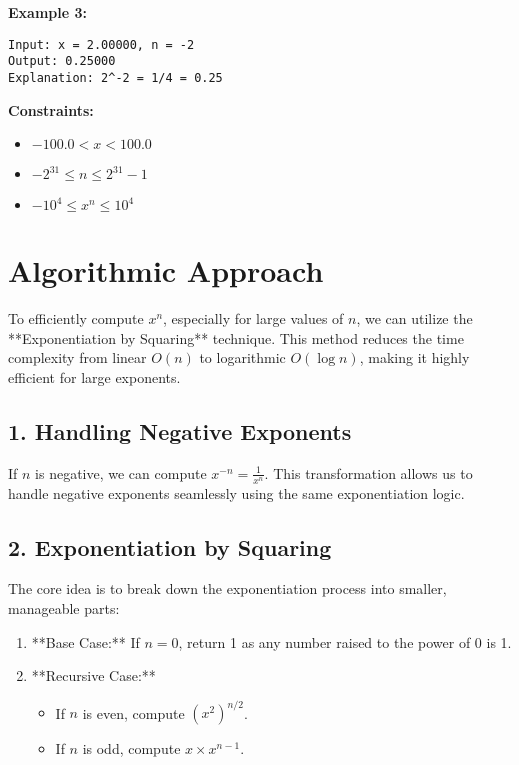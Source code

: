 \textbf{Example 3:}

\begin{verbatim}
Input: x = 2.00000, n = -2
Output: 0.25000
Explanation: 2^-2 = 1/4 = 0.25
\end{verbatim}

\textbf{Constraints:}

\begin{itemize}
    \item \(-100.0 < x < 100.0\)
    \item \(-2^{31} \leq n \leq 2^{31} - 1\)
    \item \(-10^4 \leq x^n \leq 10^4\)
\end{itemize}


\section*{Algorithmic Approach}

To efficiently compute \(x^n\), especially for large values of \(n\), we can utilize the **Exponentiation by Squaring** technique. This method reduces the time complexity from linear \(O(n)\) to logarithmic \(O(\log n)\), making it highly efficient for large exponents.

\subsection*{1. Handling Negative Exponents}

If \(n\) is negative, we can compute \(x^{-n} = \frac{1}{x^n}\). This transformation allows us to handle negative exponents seamlessly using the same exponentiation logic.

\subsection*{2. Exponentiation by Squaring}

The core idea is to break down the exponentiation process into smaller, manageable parts:
\begin{enumerate}
    \item **Base Case:** If \(n = 0\), return 1 as any number raised to the power of 0 is 1.
    \item **Recursive Case:**
    \begin{itemize}
        \item If \(n\) is even, compute \((x^{2})^{n/2}\).
        \item If \(n\) is odd, compute \(x \times x^{n-1}\).
    \end{itemize}
\end{enumerate}

